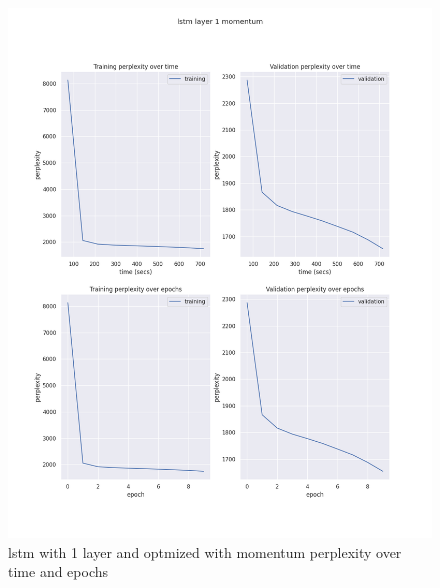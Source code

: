\documentclass[12pt]{article}
\theoremstyle{definition}
\begin{document}
\begin{figure}[H]
     \centering
     \includegraphics[scale=0.4]{lstm_layer_1_momentum.png}
     \caption{lstm with 1 layer and optmized with momentum perplexity over time and epochs}
\end{figure}
\end{document}
